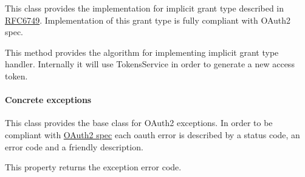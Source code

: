 \documentclass[letterpaper,10pt,english]{sphinxmanual}
\begin{document}

\begin{fulllineitems}
\label{features/oauth2/technical_summary:fantastico.oauth2.implicit_grant_handler.ImplicitGrantHandler}
This class provides the implementation for implicit grant type described in
\href{http://tools.ietf.org/html/rfc6749}{RFC6749}. Implementation of this grant type is fully compliant with OAuth2 spec.

\begin{fulllineitems}
\label{features/oauth2/technical_summary:fantastico.oauth2.implicit_grant_handler.ImplicitGrantHandler.handle_grant}
This method provides the algorithm for implementing implicit grant type handler. Internally it will use TokensService
in order to generate a new access token.

\end{fulllineitems}


\end{fulllineitems}



\paragraph{Concrete exceptions}
\label{features/oauth2/technical_summary:concrete-exceptions}

\begin{fulllineitems}
\label{features/oauth2/technical_summary:fantastico.oauth2.exceptions.OAuth2Error}
This class provides the base class for OAuth2 exceptions. In order to be compliant with
\href{http://tools.ietf.org/html/rfc6749}{OAuth2 spec} each oauth error is described by a status code, an error code and a
friendly description.

\begin{fulllineitems}
\label{features/oauth2/technical_summary:fantastico.oauth2.exceptions.OAuth2Error.error_code}
This property returns the exception error code.

\end{fulllineitems}


\end{fulllineitems}
\end{document}
